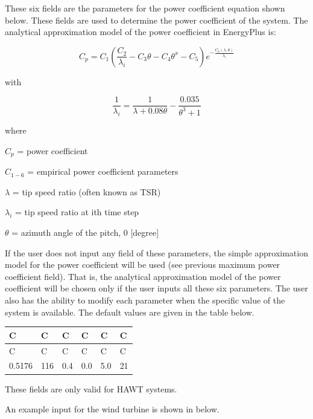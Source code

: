 These six fields are the parameters for the power coefficient equation shown below. These fields are used to determine the power coefficient of the system. The analytical approximation model of the power coefficient in EnergyPlus is:

\begin{equation}
{C_p} = {C_1}(\frac{{{C_2}}}{{{\lambda_i}}} - {C_3}\theta  - {C_4}{\theta ^x} - {C_5}){e^{ - \frac{{{C_6}(\lambda ,\theta )}}{{{\lambda_i}}}}}
\end{equation}

with

\begin{equation}
\frac{1}{{{\lambda_i}}} = \frac{1}{{\lambda  + 0.08\theta }} - \frac{{0.035}}{{{\theta ^3} + 1}}
\end{equation}

where

\(C_p\) = power coefficient

\(C_{1-6}\) = empirical power coefficient parameters

\(\lambda\) = tip speed ratio (often known as TSR)

\(\lambda_i\) = tip speed ratio at ith time step

\(\theta\) = azimuth angle of the pitch, 0 {[}degree{]}

If the user does not input any field of these parameters, the simple approximation model for the power coefficient will be used (see previous maximum power coefficient field). That is, the analytical approximation model of the power coefficient will be chosen only if the user inputs all these six parameters. The user also has the ability to modify each parameter when the specific value of the system is available. The default values are given in the table below.

\begin{longtable}[c]{@{}llllll@{}}
\toprule 
C & C & C & C & C & C \tabularnewline
\midrule
\endfirsthead

\toprule 
C & C & C & C & C & C \tabularnewline
\midrule
\endhead

0.5176 & 116 & 0.4 & 0.0 & 5.0 & 21 \tabularnewline
\bottomrule
\end{longtable}

These fields are only valid for HAWT systems.

An example input for the wind turbine is shown in below.

